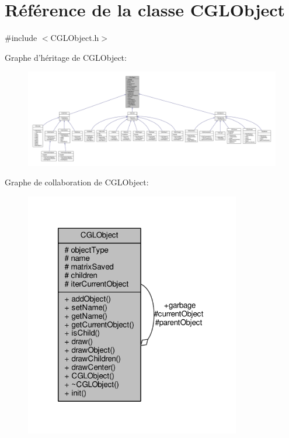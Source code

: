 \hypertarget{class_c_g_l_object}{\section{Référence de la classe C\-G\-L\-Object}
\label{class_c_g_l_object}
}


{\ttfamily \#include $<$C\-G\-L\-Object.\-h$>$}



Graphe d'héritage de C\-G\-L\-Object\-:\nopagebreak
\begin{figure}[H]
\begin{center}
\leavevmode
\includegraphics[width=350pt]{d8/d78/class_c_g_l_object__inherit__graph}
\end{center}
\end{figure}


Graphe de collaboration de C\-G\-L\-Object\-:\nopagebreak
\begin{figure}[H]
\begin{center}
\leavevmode
\includegraphics[width=267pt]{dd/dbf/class_c_g_l_object__coll__graph}
\end{center}
\end{figure}

